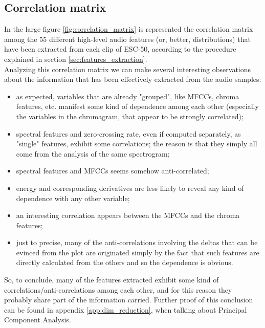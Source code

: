
\subsection{Correlation matrix}
\label{app:correlation_matrix}
In the large figure \ref{fig:correlation_matrix} is represented the correlation matrix among the 55 different high-level audio features (or, better, distributions) that have been extracted from each clip of ESC-50, according to the procedure explained in section \ref{sec:features_extraction}.\\
Analyzing this correlation matrix we can make several interesting observations about the information that has been effectively extracted from the audio samples:
\begin{itemize}
	\itemsep0em
	\item as expected, variables that are already "grouped", like MFCCs, chroma features, etc. manifest some kind of dependence among each other (especially the variables in the chromagram, that appear to be strongly correlated);
	\item spectral features and zero-crossing rate, even if computed separately, as "single" features, exhibit some correlations; the reason is that they simply all come from the analysis of the same spectrogram;
	\item spectral features and MFCCs seems somehow anti-correlated;
	\item energy and corresponding derivatives are less likely to reveal any kind of dependence with any other variable;
	\item an interesting correlation appears between the MFCCs and the chroma features;
	\item just to precise, many of the anti-correlations involving the deltas that can be evinced from the plot are originated simply by the fact that such features are directly calculated from the others and so the dependence is obvious.
\end{itemize}

So, to conclude, many of the features extracted exhibit some kind of correlations/anti-correlations among each other, and for this reason they probably share part of the information carried. Further proof of this conclusion can be found in appendix \ref{app:dim_reduction}, when talking about Principal Component Analysis.

